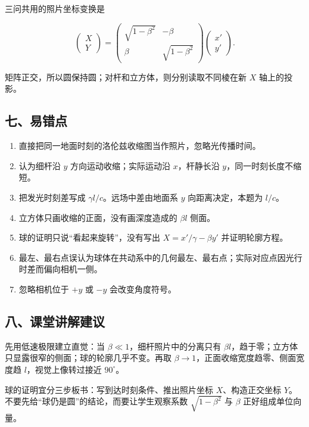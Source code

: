 \documentclass[12pt,a4paper,UTF8]{ctexart}
\newcommand{\tightlist}{\setlength{\itemsep}{0pt}\setlength{\parskip}{0pt}}
\begin{document}
三问共用的照片坐标变换是

\[
\begin{pmatrix}X\\Y\end{pmatrix}
=
\begin{pmatrix}
\sqrt{1-\beta^2}&-\beta\\
\beta&\sqrt{1-\beta^2}
\end{pmatrix}
\begin{pmatrix}x'\\y'\end{pmatrix}.
\]

矩阵正交，所以圆保持圆；对杆和立方体，则分别读取不同棱在新 \(X\)
轴上的投影。

\subsection{七、易错点}\label{ux4e03ux6613ux9519ux70b9-7}

\begin{enumerate}
\def\labelenumi{\arabic{enumi}.}
\tightlist
\item
  直接把同一地面时刻的洛伦兹收缩图当作照片，忽略光传播时间。
\item
  认为细杆沿 \(y\) 方向运动收缩；实际运动沿 \(x\)，杆静长沿
  \(y\)，同一时刻长度不缩短。
\item
  把发光时刻差写成 \(\gamma l/c\)。远场中差由地面系 \(y\)
  向距离决定，本题为 \(l/c\)。
\item
  立方体只画收缩的正面，没有画深度造成的 \(\beta l\) 侧面。
\item
  球的证明只说``看起来旋转''，没有写出 \(X=x'/\gamma-\beta y'\)
  并证明轮廓方程。
\item
  最左、最右点误认为球体在共动系中的几何最左、最右点；实际对应点因光行时差而偏向相机一侧。
\item
  忽略相机位于 \(+y\) 或 \(-y\) 会改变角度符号。
\end{enumerate}

\subsection{八、课堂讲解建议}\label{ux516bux8bfeux5802ux8bb2ux89e3ux5efaux8bae-7}

先用低速极限建立直觉：当 \(\beta\ll1\)，细杆照片中的分离只有
\(\beta l\)，趋于零；立方体只显露很窄的侧面；球的轮廓几乎不变。再取
\(\beta\to1\)，正面收缩宽度趋零、侧面宽度趋 \(l\)，视觉上像转过接近
\(90^\circ\)。

球的证明宜分三步板书：写到达时刻条件、推出照片坐标 \(X\)、构造正交坐标
\(Y\)。不要先给``球仍是圆''的结论，而要让学生观察系数
\(\sqrt{1-\beta^2}\) 与 \(\beta\) 正好组成单位向量。
\end{document}
